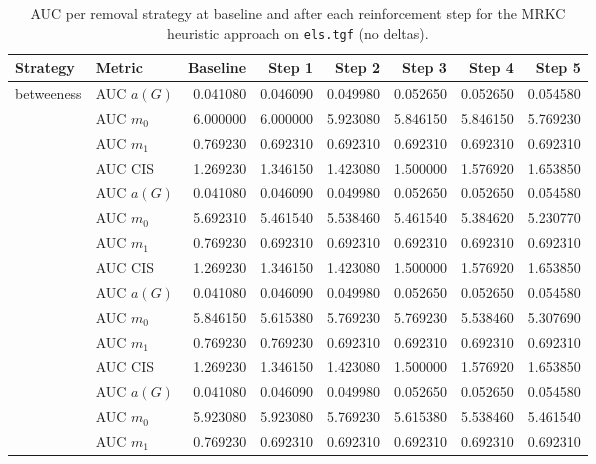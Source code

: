 
\begin{table}[htbp]
  \centering
  \caption{AUC per removal strategy at baseline and after each reinforcement step for the MRKC heuristic approach on \texttt{els.tgf} (no deltas).}
  \label{tab:els-mrkc_heuristic-auc}
  \begin{tabular}{llrrrrrr}
    \toprule
    \textbf{Strategy} & \textbf{Metric} & \textbf{Baseline} & \textbf{Step 1} & \textbf{Step 2} & \textbf{Step 3} & \textbf{Step 4} & \textbf{Step 5} \\
    \midrule
    \multirow{4}{*}{betweeness} & AUC $a(G)$ & 0.041080 & 0.046090 & 0.049980 & 0.052650 & 0.052650 & 0.054580 \\
    & AUC $m_0$ & 6.000000 & 6.000000 & 5.923080 & 5.846150 & 5.846150 & 5.769230 \\
    & AUC $m_1$ & 0.769230 & 0.692310 & 0.692310 & 0.692310 & 0.692310 & 0.692310 \\
    & AUC CIS & 1.269230 & 1.346150 & 1.423080 & 1.500000 & 1.576920 & 1.653850 \\
    \addlinespace
    \multirow{4}{*}{closeness} & AUC $a(G)$ & 0.041080 & 0.046090 & 0.049980 & 0.052650 & 0.052650 & 0.054580 \\
    & AUC $m_0$ & 5.692310 & 5.461540 & 5.538460 & 5.461540 & 5.384620 & 5.230770 \\
    & AUC $m_1$ & 0.769230 & 0.692310 & 0.692310 & 0.692310 & 0.692310 & 0.692310 \\
    & AUC CIS & 1.269230 & 1.346150 & 1.423080 & 1.500000 & 1.576920 & 1.653850 \\
    \addlinespace
    \multirow{4}{*}{core influence} & AUC $a(G)$ & 0.041080 & 0.046090 & 0.049980 & 0.052650 & 0.052650 & 0.054580 \\
    & AUC $m_0$ & 5.846150 & 5.615380 & 5.769230 & 5.769230 & 5.538460 & 5.307690 \\
    & AUC $m_1$ & 0.769230 & 0.769230 & 0.692310 & 0.692310 & 0.692310 & 0.692310 \\
    & AUC CIS & 1.269230 & 1.346150 & 1.423080 & 1.500000 & 1.576920 & 1.653850 \\
    \addlinespace
    \multirow{4}{*}{degree} & AUC $a(G)$ & 0.041080 & 0.046090 & 0.049980 & 0.052650 & 0.052650 & 0.054580 \\
    & AUC $m_0$ & 5.923080 & 5.923080 & 5.769230 & 5.615380 & 5.538460 & 5.461540 \\
    & AUC $m_1$ & 0.769230 & 0.692310 & 0.692310 & 0.692310 & 0.692310 & 0.692310 \\

\end{tabular}
\end{table}

